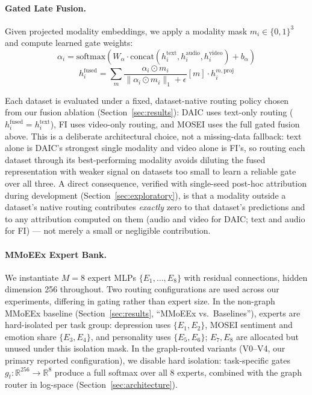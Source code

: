 \documentclass[twocolumn]{article}
\begin{document}
\paragraph{Gated Late Fusion.} Given projected modality embeddings, we apply a modality mask $m_i \in \{0,1\}^3$ and compute learned gate weights:
\begin{equation}
    \alpha_i = \text{softmax}(W_\alpha \cdot \text{concat}(h_i^{\text{text}}, h_i^{\text{audio}}, h_i^{\text{video}}) + b_\alpha)
\end{equation}
\begin{equation}
    h_i^{\text{fused}} = \sum_{m} \frac{\alpha_i \odot m_i}{\|\alpha_i \odot m_i\|_1 + \epsilon}[m] \cdot h_i^{m,\text{proj}}
\end{equation}

Each dataset is evaluated under a fixed, dataset-native routing policy chosen from our fusion ablation (Section~\ref{sec:results}): DAIC uses text-only routing ($h_i^{\text{fused}} = h_i^{\text{text}}$), FI uses video-only routing, and MOSEI uses the full gated fusion above. This is a deliberate architectural choice, not a missing-data fallback: text alone is DAIC's strongest single modality and video alone is FI's, so routing each dataset through its best-performing modality avoids diluting the fused representation with weaker signal on datasets too small to learn a reliable gate over all three. A direct consequence, verified with single-seed post-hoc attribution during development (Section~\ref{sec:exploratory}), is that a modality outside a dataset's native routing contributes \emph{exactly} zero to that dataset's predictions and to any attribution computed on them (audio and video for DAIC; text and audio for FI) — not merely a small or negligible contribution.

\paragraph{MMoEEx Expert Bank.} We instantiate $M=8$ expert MLPs $\{E_1, \ldots, E_8\}$ with residual connections, hidden dimension 256 throughout. Two routing configurations are used across our experiments, differing in gating rather than expert size. In the non-graph MMoEEx baseline (Section~\ref{sec:results}, ``MMoEEx vs.\ Baselines''), experts are hard-isolated per task group: depression uses $\{E_1,E_2\}$, MOSEI sentiment and emotion share $\{E_3,E_4\}$, and personality uses $\{E_5,E_6\}$; $E_7,E_8$ are allocated but unused under this isolation mask. In the graph-routed variants (V0--V4, our primary reported configuration), we disable hard isolation: task-specific gates $g_t: \mathbb{R}^{256} \to \mathbb{R}^8$ produce a full softmax over all 8 experts, combined with the graph router in log-space (Section~\ref{sec:architecture}).
\end{document}

